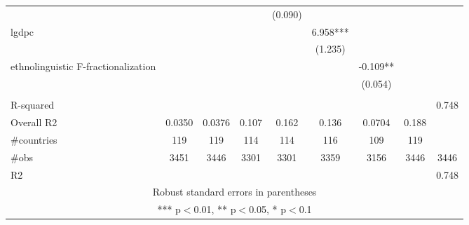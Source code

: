 \documentclass[]{article}
\begin{document}
\begin{tabular}{lcccccccc}
 &  &  &  & (0.090) &  &  &  &  \\
lgdpc &  &  &  &  & 6.958*** &  &  &  \\
 &  &  &  &  & (1.235) &  &  &  \\
ethnolinguistic F-fractionalization &  &  &  &  &  & -0.109** &  &  \\
 &  &  &  &  &  & (0.054) &  &  \\
 &  &  &  &  &  &  &  &  \\
R-squared &  &  &  &  &  &  &  & 0.748 \\
Overall R2 & 0.0350 & 0.0376 & 0.107 & 0.162 & 0.136 & 0.0704 & 0.188 &  \\
\#countries & 119 & 119 & 114 & 114 & 116 & 109 & 119 &  \\
\#obs & 3451 & 3446 & 3301 & 3301 & 3359 & 3156 & 3446 & 3446 \\
 R2 &  &  &  &  &  &  &  & 0.748 \\ \hline
\multicolumn{9}{c}{ Robust standard errors in parentheses} \\
\multicolumn{9}{c}{ *** p$<$0.01, ** p$<$0.05, * p$<$0.1} \\
\end{tabular}
\end{document}
